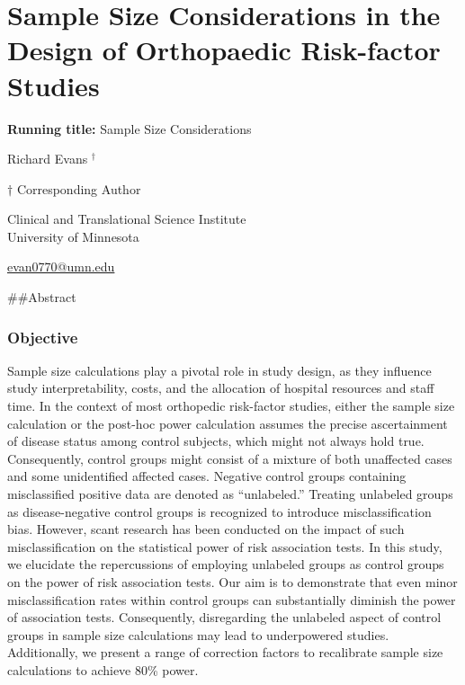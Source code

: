 \documentclass[
]{article}
\author{}
\date{\vspace{-2.5em}}
\begin{document}
\hypertarget{sample-size-considerations-in-the-design-of-orthopaedic-risk-factor-studies}{%
\section{Sample Size Considerations in the Design of Orthopaedic
Risk-factor
Studies}\label{sample-size-considerations-in-the-design-of-orthopaedic-risk-factor-studies}}

\textbf{Running title:} Sample Size Considerations

Richard Evans \({^\dagger}\)

\({\dagger}\) Corresponding Author

Clinical and Translational Science Institute\\
University of Minnesota

\href{mailto:evan0770@umn.edu}{evan0770@umn.edu}

\newpage

\#\#Abstract

\hypertarget{objective}{%
\subsubsection{Objective}\label{objective}}

Sample size calculations play a pivotal role in study design, as they
influence study interpretability, costs, and the allocation of hospital
resources and staff time. In the context of most orthopedic risk-factor
studies, either the sample size calculation or the post-hoc power
calculation assumes the precise ascertainment of disease status among
control subjects, which might not always hold true. Consequently,
control groups might consist of a mixture of both unaffected cases and
some unidentified affected cases. Negative control groups containing
misclassified positive data are denoted as ``unlabeled.'' Treating
unlabeled groups as disease-negative control groups is recognized to
introduce misclassification bias. However, scant research has been
conducted on the impact of such misclassification on the statistical
power of risk association tests. In this study, we elucidate the
repercussions of employing unlabeled groups as control groups on the
power of risk association tests. Our aim is to demonstrate that even
minor misclassification rates within control groups can substantially
diminish the power of association tests. Consequently, disregarding the
unlabeled aspect of control groups in sample size calculations may lead
to underpowered studies. Additionally, we present a range of correction
factors to recalibrate sample size calculations to achieve 80\% power.
\end{document}
